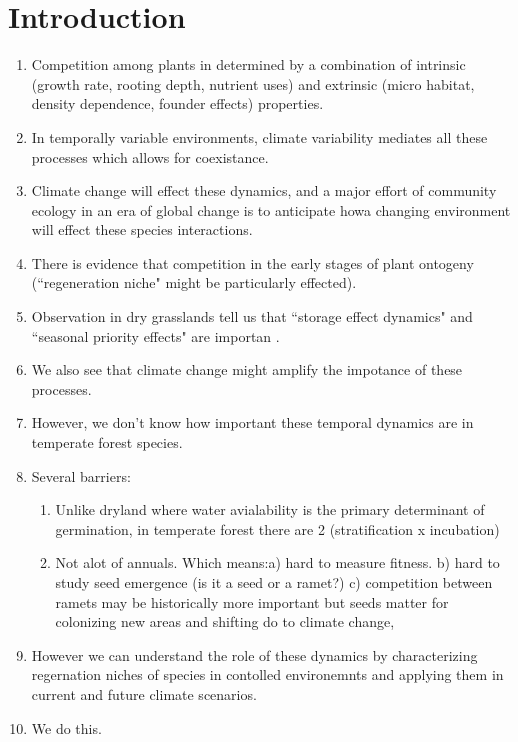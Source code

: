 \documentclass[11pt]{article}
\date{}
\author{D.M. Buonaiuto $^{1,2,a}$, E.M. Wolkovich$^{3}$}
\begin{document}
\maketitle
\section*{Introduction}

\begin{enumerate}
\item Competition among plants in determined by a combination of intrinsic (growth rate, rooting depth, nutrient uses) and extrinsic (micro habitat, density dependence, founder effects) properties. 
\item In temporally variable environments, climate variability mediates all these processes which allows for coexistance.
\item Climate change will effect these dynamics, and a major effort of community ecology in an era of global change is to anticipate howa changing environment will effect these species interactions.
\item There is evidence that competition in the early stages of plant ontogeny (``regeneration niche" might be particularly effected).
\item Observation in dry grasslands tell us that ``storage effect dynamics" and ``seasonal priority effects" are importan \citep{Rudolf:2019a}.
\item We also see that climate change might amplify the impotance of these processes. 

\item However, we don't know how important these temporal dynamics are in temperate forest species. 
\item Several barriers:
\begin{enumerate}
\item Unlike dryland where water avialability is the primary determinant of germination, in temperate forest there are 2 (stratification x incubation)
\item Not alot of annuals. Which means:a) hard to measure fitness. b) hard to study seed emergence (is it a seed or a ramet?) c) competition between ramets may be historically more important but seeds matter for colonizing new areas and shifting do to climate change,
\end{enumerate}
\item However we can understand the role of these dynamics by characterizing regernation niches of species in contolled environemnts and applying them in current and future climate scenarios.
\item We do this.
\end{enumerate}
\end{document}
